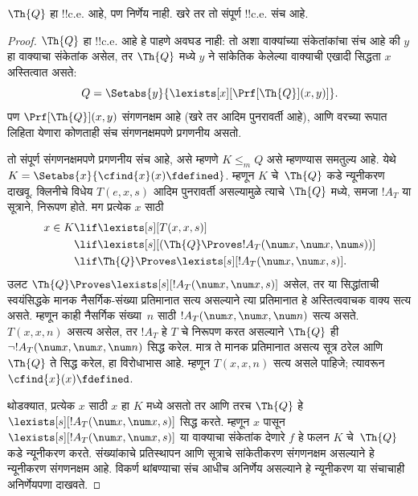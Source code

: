 \documentclass[../../../include/open-logic-section]{subfiles}
\begin{document}



\begin{thm}
$\Th{Q}$ हा !!{c.e.} आहे, पण निर्णेय नाही.
खरे तर तो संपूर्ण !!{c.e.} संच आहे.
\end{thm}

\begin{proof}
$\Th{Q}$ हा !!{c.e.} आहे हे पाहणे अवघड नाही:
तो अशा वाक्यांच्या संकेतांकांचा संच आहे की
$y$ हा वाक्याचा संकेतांक असेल, तर $\Th{Q}$ मध्ये
$y$ ने सांकेतिक केलेल्या वाक्याची एखादी सिद्धता $x$ अस्तित्वात असते:
\[
Q = \Setabs{y}{\lexists[x][\Prf[\Th{Q}](x,y)]}.
\]
पण $\Prf[\Th{Q}](x,y)$ संगणनक्षम आहे
(खरे तर आदिम पुनरावर्ती आहे), आणि वरच्या रूपात
लिहिता येणारा कोणताही संच संगणनक्षमपणे प्रगणनीय असतो.

तो संपूर्ण संगणनक्षमपणे प्रगणनीय संच आहे, असे म्हणणे
$K \leq_m Q$ असे म्हणण्यास समतुल्य आहे. येथे
$K = \Setabs{x}{\cfind{x}(x) \fdefined}$.
म्हणून $K$ चे~$\Th{Q}$ कडे न्यूनीकरण दाखवू.
क्लिनीचे विधेय $T(e,x,s)$ आदिम पुनरावर्ती असल्यामुळे
त्याचे $\Th{Q}$ मध्ये, समजा $!A_T$ या सूत्राने, निरूपण
होते. मग प्रत्येक $x$ साठी
\begin{align*}
x \in K & \lif \lexists[s][T(x,x,s)] \\
& \lif \lexists[s][(\Th{Q} \Proves !A_T(\num x,\num x, \num s))]
  \\
& \lif \Th{Q} \Proves \lexists[s][!A_T(\num x, \num x, s)].
\end{align*}
उलट $\Th{Q} \Proves \lexists[s][!A_T(\num x, \num x, s)]$
असेल, तर या सिद्धांताची स्वयंसिद्धके मानक नैसर्गिक-संख्या
प्रतिमानात सत्य असल्याने त्या प्रतिमानात हे अस्तित्ववाचक
वाक्य सत्य असते. म्हणून काही नैसर्गिक संख्या~$n$ साठी
$!A_T(\num x, \num x, \num n)$ सत्य असते.
$T(x,x,n)$ असत्य असेल, तर $!A_T$ हे $T$ चे
निरूपण करत असल्याने $\Th{Q}$ ही
$\lnot !A_T(\num x, \num x, \num n)$ सिद्ध करेल.
मात्र ते मानक प्रतिमानात असत्य सूत्र ठरेल आणि
$\Th{Q}$ ते सिद्ध करेल, हा विरोधाभास आहे.
म्हणून $T(x,x,n)$ सत्य असले पाहिजे; त्यावरून
$\cfind{x}(x) \fdefined$.

थोडक्यात, प्रत्येक $x$ साठी $x$ हा $K$ मध्ये
असतो तर आणि तरच $\Th{Q}$ हे
$\lexists[s][!A_T(\num x,\num x,s)]$ सिद्ध करते.
म्हणून $x$ पासून
$\lexists[s][!A_T(\num x,
  \num x, s)]$ या वाक्याचा संकेतांक देणारे
$f$ हे फलन $K$ चे~$\Th{Q}$ कडे न्यूनीकरण करते.
संख्यांकाचे प्रतिस्थापन आणि सूत्राचे सांकेतीकरण
संगणनक्षम असल्याने हे न्यूनीकरण संगणनक्षम आहे.
विकर्ण थांबण्याचा संच आधीच अनिर्णेय असल्याने
हे न्यूनीकरण या संचाचाही अनिर्णेयपणा दाखवते.
\end{proof}
\end{document}
